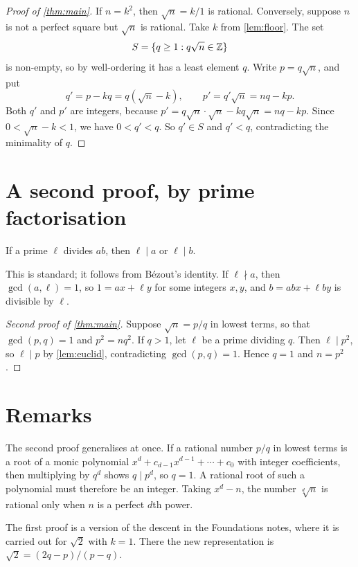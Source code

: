 \documentclass[11pt,a4paper]{article}
\begin{document}
\begin{proof}[Proof of \cref{thm:main}]
  If $n = k^2$, then $\sqrt n = k/1$ is rational. Conversely, suppose $n$ is not a
  perfect square but $\sqrt n$ is rational. Take $k$ from \cref{lem:floor}. The set
  \[
    S = \{q \geq 1 : q\sqrt n \in \mathbb{Z}\}
  \]
  is non-empty, so by well-ordering it has a least element $q$. Write $p = q\sqrt n$,
  and put
  \[
    q' = p - kq = q(\sqrt n - k), \qquad p' = q'\sqrt n = nq - kp .
  \]
  Both $q'$ and $p'$ are integers, because $p' = q\sqrt n \cdot \sqrt n - kq\sqrt n
  = nq - kp$. Since $0 < \sqrt n - k < 1$, we have $0 < q' < q$. So $q' \in S$ and
  $q' < q$, contradicting the minimality of $q$.
\end{proof}

\section{A second proof, by prime factorisation}

\begin{lemma}[Euclid]\label{lem:euclid}
  If a prime $\ell$ divides $ab$, then $\ell \mid a$ or $\ell \mid b$.
\end{lemma}

This is standard; it follows from B\'ezout's identity. If $\ell \nmid a$, then
$\gcd(a, \ell) = 1$, so $1 = ax + \ell y$ for some integers $x, y$, and
$b = abx + \ell b y$ is divisible by $\ell$.

\begin{proof}[Second proof of \cref{thm:main}]
  Suppose $\sqrt n = p/q$ in lowest terms, so that $\gcd(p, q) = 1$ and $p^2 = nq^2$.
  If $q > 1$, let $\ell$ be a prime dividing $q$. Then $\ell \mid p^2$, so
  $\ell \mid p$ by \cref{lem:euclid}, contradicting $\gcd(p, q) = 1$. Hence $q = 1$
  and $n = p^2$.
\end{proof}

\section{Remarks}

\begin{remark}
  The second proof generalises at once. If a rational number $p/q$ in lowest terms is
  a root of a monic polynomial $x^d + c_{d-1}x^{d-1} + \dotsb + c_0$ with integer
  coefficients, then multiplying by $q^d$ shows $q \mid p^d$, so $q = 1$. A rational
  root of such a polynomial must therefore be an integer. Taking $x^d - n$, the
  number $\sqrt[d]{n}$ is rational only when $n$ is a perfect $d$th power.
\end{remark}

\begin{remark}
  The first proof is a version of the descent in the Foundations notes, where it is
  carried out for $\sqrt 2$ with $k = 1$. There the new representation
  is $\sqrt 2 = (2q - p)/(p - q)$.
\end{remark}
\end{document}

